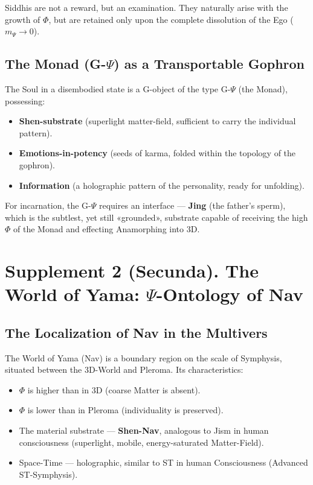 \documentclass[a4paper,12pt]{article}
\begin{document}
	Siddhis are not a reward, but an examination. They naturally arise with the growth of $\Phi$, but are retained only upon the complete dissolution of the Ego ($m_{\Psi} \to 0$).
	
	\subsection{The Monad (G-$\Psi$) as a Transportable Gophron}
	
	The Soul in a disembodied state is a G-object of the type G-$\Psi$ (the Monad), possessing:
	
	\begin{itemize}
		\item \textbf{Shen-substrate} (superlight matter-field, sufficient to carry the individual pattern).
		\item \textbf{Emotions-in-potency} (seeds of karma, folded within the topology of the gophron).
		\item \textbf{Information} (a holographic pattern of the personality, ready for unfolding).
	\end{itemize}
	
	For incarnation, the G-$\Psi$ requires an interface — \textbf{Jing} (the father's sperm), which is the subtlest, yet still «grounded», substrate capable of receiving the high $\Phi$ of the Monad and effecting Anamorphing into 3D.
	
	\newpage
	\section{Supplement 2 (Secunda). The World of Yama: $\Psi$-Ontology of Nav}
	
	\subsection{The Localization of Nav in the Multivers}
	
	The World of Yama (Nav) is a boundary region on the scale of Symphysis, situated between the 3D-World and Pleroma. Its characteristics:
	
	\begin{itemize}
		\item $\Phi$ is higher than in 3D (coarse Matter is absent).
		\item $\Phi$ is lower than in Pleroma (individuality is preserved).
		\item The material substrate — \textbf{Shen-Nav}, analogous to Jism in human consciousness (superlight, mobile, energy-saturated Matter-Field).
		\item Space-Time — holographic, similar to ST in human Consciousness (Advanced ST-Symphysis).
	\end{itemize}
	
\end{document}
